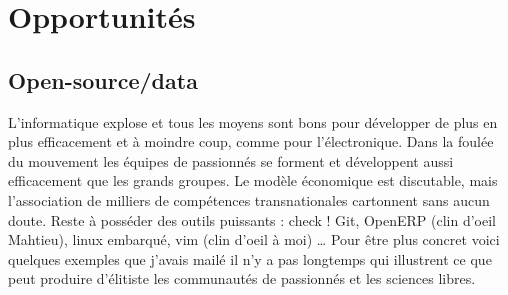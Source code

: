 \section{Opportunités}

\subsection{Open-source/data}

\begin{minipage}[c]{10cm}
  L'informatique explose et tous les moyens sont bons pour développer de plus
en plus efficacement et à moindre coup, comme pour l'électronique. Dans la
foulée du mouvement les équipes de passionnés se forment et développent
aussi efficacement que les grands groupes. Le modèle économique est
discutable, mais l'association de milliers de compétences transnationales
cartonnent sans aucun doute.\newline
Reste à posséder des outils puissants : check ! Git, OpenERP (clin d'oeil
Mahtieu), linux embarqué, vim (clin d'oeil à moi) \ldots \newline
\newline
Pour être plus concret voici quelques exemples que j'avais mailé il n'y a
pas longtemps qui illustrent ce que peut produire d'élitiste les
communautés de passionnés et les sciences libres. \newline
\end{minipage}

